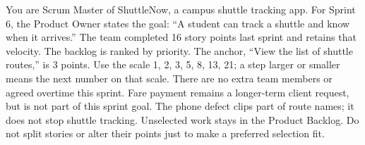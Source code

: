 \begin{contenttable}
{You are Scrum Master of ShuttleNow, a campus shuttle tracking app. For Sprint 6, the Product Owner states the goal: “A student can track a shuttle and know when it arrives.”}
{The team completed 16 story points last sprint and retains that velocity. The backlog is ranked by priority. The anchor, “View the list of shuttle routes,” is 3 points. Use the scale 1, 2, 3, 5, 8, 13, 21; a step larger or smaller means the next number on that scale.}
{There are no extra team members or agreed overtime this sprint. Fare payment remains a longer-term client request, but is not part of this sprint goal. The phone defect clips part of route names; it does not stop shuttle tracking. Unselected work stays in the Product Backlog. Do not split stories or alter their points just to make a preferred selection fit.}
\end{contenttable}

